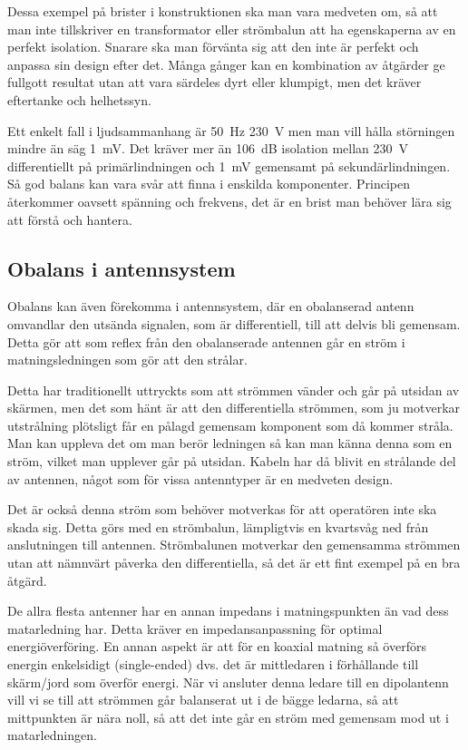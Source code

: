 Dessa exempel på brister i konstruktionen ska man vara medveten om, så att man
inte tillskriver en transformator eller strömbalun att ha egenskaperna av en
perfekt isolation.
Snarare ska man förvänta sig att den inte är perfekt och anpassa sin design
efter det.
Många gånger kan en kombination av åtgärder ge fullgott resultat utan att vara
särdeles dyrt eller klumpigt, men det kräver eftertanke och helhetssyn.

Ett enkelt fall i ljudsammanhang är 50~Hz 230~V men man vill hålla störningen
mindre än säg 1~mV.
Det kräver mer än 106~dB isolation mellan 230~V differentiellt på
primärlindningen och 1~mV gemensamt på sekundärlindningen.
Så god balans kan vara svår att finna i enskilda komponenter.
Principen återkommer oavsett spänning och frekvens, det är en brist
man behöver lära sig att förstå och hantera.

\subsection{Obalans i antennsystem}

Obalans kan även förekomma i antennsystem, där en obalanserad antenn omvandlar
den utsända signalen, som är differentiell, till att delvis bli gemensam.
Detta gör att som reflex från den obalanserade antennen går en ström i
matningsledningen som gör att den strålar.

Detta har traditionellt uttryckts som att strömmen vänder och går på utsidan av
skärmen, men det som hänt är att den differentiella strömmen, som ju motverkar
utstrålning plötsligt får en pålagd gemensam komponent som då kommer stråla.
Man kan uppleva det om man berör ledningen så kan man känna denna som en ström,
vilket man upplever går på utsidan.
Kabeln har då blivit en strålande del av antennen, något som för vissa
antenntyper är en medveten design.

Det är också denna ström som behöver motverkas för att operatören inte ska
skada sig.
Detta görs med en strömbalun, lämpligtvis en kvartsvåg ned från anslutningen
till antennen.
Strömbalunen motverkar den gemensamma strömmen utan att nämnvärt påverka
den differentiella, så det är ett fint exempel på en bra åtgärd.

De allra flesta antenner har en annan impedans i matningspunkten än vad dess
matarledning har.
Detta kräver en impedansanpassning för optimal energiöverföring.
En annan aspekt är att för en koaxial matning så överförs energin enkelsidigt
(single-ended) dvs. det är mittledaren i förhållande till skärm/jord som
överför energi.
När vi ansluter denna ledare till en dipolantenn vill vi se till att strömmen
går balanserat ut i de bägge ledarna, så att mittpunkten är nära noll, så att
det inte går en ström med gemensam mod ut i matarledningen.

